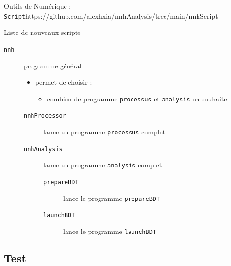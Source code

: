 \documentclass[9pt]{beamer}
\begin{document}
\begin{frame}{Outils de Numérique : \texttt{Script}}{https://github.com/alexhxia/nnhAnalysis/tree/main/nnhScript}

\begin{block}{Liste de nouveaux scripts}
	\begin{description}
		\item[\texttt{nnh}] programme général 
		\begin{itemize}
			\item permet de choisir :
			\begin{itemize}
				\item combien de programme \texttt{processus} et \texttt{analysis} on souhaite
			\end{itemize}
		\end{itemize}
		\begin{description}
			\item[\texttt{nnhProcessor}] lance un programme \texttt{processus} complet
			\item[\texttt{nnhAnalysis}] lance un programme \texttt{analysis} complet
			\begin{description}
				\item[\texttt{prepareBDT}] lance le programme \texttt{prepareBDT}
				\item[\texttt{launchBDT}] lance le programme \texttt{launchBDT}
			\end{description}
		\end{description}
	\end{description}
\end{block}

\end{frame}

\subsection{Test}
\end{document}
